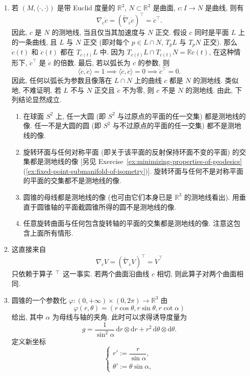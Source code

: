 \begin{description}[font=\normalfont,leftmargin=2em,labelwidth=1.5em]
\begin{enumerate}[label=(\alph*),ref=\alph*,leftmargin=*]
\item 若 $(M,\langle\cdot,\cdot\rangle)$ 是带 Euclid 度量的 $\mathbb{R}^3$, $N\subset\mathbb{R}^3$ 是曲面, $c:I\to N$ 是曲线, 则有
\[
  \nabla_{\dot c}\dot c=(\widetilde\nabla_{\dot c}\dot c)^\top=\ddot c^\top.
\]
因此, $c$ 是 $N$ 的测地线, 当且仅当其加速度与 $N$ 正交. 假设 $c$ 同时是平面 $L$ 上的一条曲线, 且 $L$ 与 $N$ 正交 (即对每个 $p\in L\cap N$, $T_pL$ 与 $T_pN$ 正交). 那么 $\dot c(t)$ 和 $\ddot c(t)$ 都在 $T_{c(t)}L$ 中. 因为 $T_{c(t)}L\cap T_{c(t)}N=\mathbb{R}\dot c(t)$, 在这种情形下, $\ddot c^\top$ 是 $\dot c$ 的倍数. 最后, 若以弧长为 $c$ 的参数, 则
\[
  \langle\dot c,\dot c\rangle=1\implies\langle\ddot c,\dot c\rangle=0\implies\ddot c^\top=0.
\]
因此, 任何以弧长为参数且像落在 $L\cap N$ 上的曲线 $c$ 都是 $N$ 的测地线. 类似地, 不难证明, 若 $L$ 不与 $N$ 正交且 $\ddot c$ 不为零, 则 $c$ 不是 $N$ 的测地线. 由此, 下列结论显然成立.
\begin{enumerate}[label=(\roman*),ref=\roman*,leftmargin=*]
\item 在球面 $S^2$ 上, 任一大圆 (即 $S^2$ 与过原点的平面的任一交集) 都是测地线的像. 任一不是大圆的圆 (即 $S^2$ 与不过原点的平面的任一交集) 都不是测地线的像.
\item 旋转环面与任何对称平面 (即关于该平面的反射保持环面不变的平面) 的交集都是测地线的像 [另见 Exercise~\ref{ex:minimizing-properties-of-geodesics}(\ref{ex:fixed-point-submanifold-of-isometry})]. 旋转环面与任何不是对称平面的平面的交集都不是测地线的像.
\item 圆锥的母线都是测地线的像 (也可由它们本身已是 $\mathbb{R}^3$ 的测地线看出). 用垂直于圆锥轴的平面截圆锥所得的圆不是测地线的像.
\item 任意旋转曲面与任何包含旋转轴的平面的交集都是测地线的像. 注意这包含上面所有情形.
\end{enumerate}
\item 这直接来自
\[
  \nabla_{\dot c}V=(\widetilde\nabla_{\dot c}V)^\top=\dot V^\top
\]
只依赖于算子 $\vphantom{w}^\top$ 这一事实. 若两个曲面沿曲线 $c$ 相切, 则此算子对两个曲面相同.
\item 圆锥的一个参数化 $\varphi:(0,+\infty)\times(0,2\pi)\to\mathbb{R}^3$ 由
\[
  \varphi(r,\theta)=(r\cos\theta,r\sin\theta,r\cot\alpha)
\]
给出, 其中 $\alpha$ 为母线与轴的夹角. 此时可以求得诱导度量为
\[
  g=\frac{1}{\sin^2\alpha}\,\mathrm{d}r\otimes\mathrm{d}r+r^2\,\mathrm{d}\theta\otimes\mathrm{d}\theta.
\]
定义新坐标
\[
  \begin{cases}
    r':=\dfrac r{\sin\alpha},\\[2pt]
    \theta':=\theta\sin\alpha,
  \end{cases}
\]
\end{enumerate}
\end{description}
